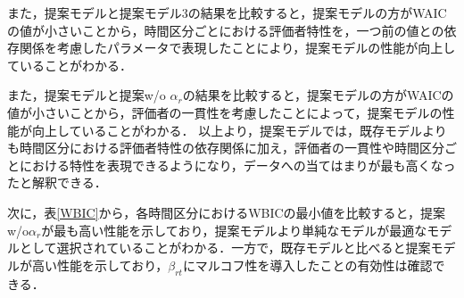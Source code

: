 \documentclass[a4paper,11pt,oneside,openany]{jsbook}
\begin{document}
また，提案モデルと提案モデル3の結果を比較すると，提案モデルの方がWAICの値が小さいことから，時間区分ごとにおける評価者特性を，一つ前の値との依存関係を考慮したパラメータで表現したことにより，提案モデルの性能が向上していることがわかる．

また，提案モデルと提案w/o $\alpha_r$の結果を比較すると，提案モデルの方がWAICの値が小さいことから，評価者の一貫性を考慮したことによって，提案モデルの性能が向上していることがわかる．
以上より，提案モデルでは，既存モデルよりも時間区分における評価者特性の依存関係に加え，評価者の一貫性や時間区分ごとにおける特性を表現できるようになり，データへの当てはまりが最も高くなったと解釈できる．

次に，表\ref{WBIC}から，各時間区分におけるWBICの最小値を比較すると，提案w/o$\alpha_r$が最も高い性能を示しており，提案モデルより単純なモデルが最適なモデルとして選択されていることがわかる．一方で，既存モデルと比べると提案モデルが高い性能を示しており，$\beta_{rt}$にマルコフ性を導入したことの有効性は確認できる．
\end{document}
